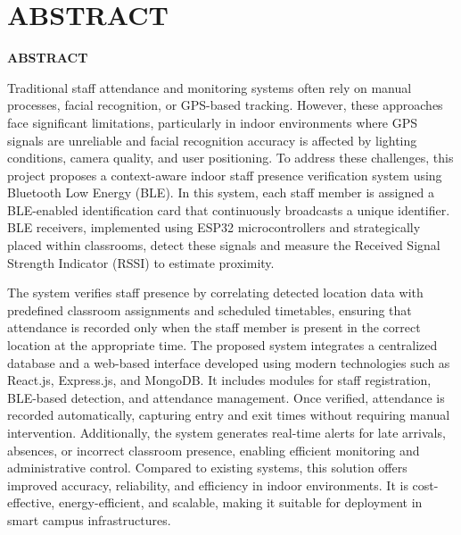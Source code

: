 \chapter*{ABSTRACT}
\doublespacing %
\normalsize
{\Large \textbf{ABSTRACT} \par}
\vspace{1cm}
Traditional staff attendance and monitoring systems often rely on manual processes, facial recognition, or GPS-based tracking. However, these approaches face significant limitations, particularly in indoor environments where GPS signals are unreliable and facial recognition accuracy is affected by lighting conditions, camera quality, and user positioning. To address these challenges, this project proposes a context-aware indoor staff presence verification system using Bluetooth Low Energy (BLE). In this system, each staff member is assigned a BLE-enabled identification card that continuously broadcasts a unique identifier. BLE receivers, implemented using ESP32 microcontrollers and strategically placed within classrooms, detect these signals and measure the Received Signal Strength Indicator (RSSI) to estimate proximity. 

The system verifies staff presence by correlating detected location data with predefined classroom assignments and scheduled timetables, ensuring that attendance is recorded only when the staff member is present in the correct location at the appropriate time. The proposed system integrates a centralized database and a web-based interface developed using modern technologies such as React.js, Express.js, and MongoDB. It includes modules for staff registration, BLE-based detection, and attendance management. Once verified, attendance is recorded automatically, capturing entry and exit times without requiring manual intervention. Additionally, the system generates real-time alerts for late arrivals, absences, or incorrect classroom presence, enabling efficient monitoring and administrative control. Compared to existing systems, this solution offers improved accuracy, reliability, and efficiency in indoor environments. It is cost-effective, energy-efficient, and scalable, making it suitable for deployment in smart campus infrastructures.
